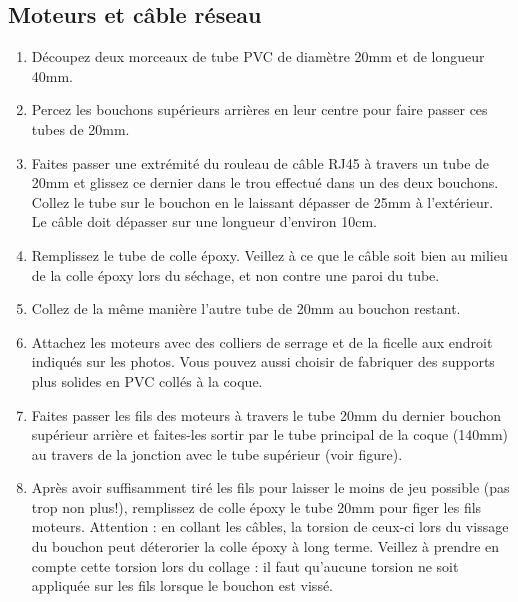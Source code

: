 \documentclass[11pt,a4paper]{article}
\begin{document}
        \subsection{Moteurs et câble réseau}
          \begin{enumerate}
            \item Découpez deux morceaux de tube PVC de diamètre 20mm et de longueur 40mm.
            
            \item Percez les bouchons supérieurs arrières en leur centre pour faire passer ces tubes de 20mm.
            
            \item Faites passer une extrémité du rouleau de câble RJ45 à travers un tube de 20mm et glissez ce dernier dans le trou effectué dans un des deux bouchons. Collez le tube sur le bouchon en le laissant dépasser de 25mm à l'extérieur. Le câble doit dépasser sur une longueur d'environ 10cm.
            
            \item Remplissez le tube de colle époxy. Veillez à ce que le câble soit bien au milieu de la colle époxy lors du séchage, et non contre une paroi du tube.
            
            \item Collez de la même manière l'autre tube de 20mm au bouchon restant.
            
            \item Attachez les moteurs avec des colliers de serrage et de la ficelle aux endroit indiqués sur les photos. Vous pouvez aussi choisir de fabriquer des supports plus solides en PVC collés à la coque.
            
            \item Faites passer les fils des moteurs à travers le tube 20mm du dernier bouchon supérieur arrière et faites-les sortir par le tube principal de la coque (140mm) au travers de la jonction avec le tube supérieur (voir figure).
            
            \item Après avoir suffisamment tiré les fils pour laisser le moins de jeu possible (pas trop non plus!), remplissez de colle époxy le tube 20mm pour figer les fils moteurs. Attention : en collant les câbles, la torsion de ceux-ci lors du vissage du bouchon peut déterorier la colle époxy à long terme. Veillez à prendre en compte cette torsion lors du collage : il faut qu'aucune torsion ne soit appliquée sur les fils lorsque le bouchon est vissé.
            
          \end{enumerate}
          
\end{document}
